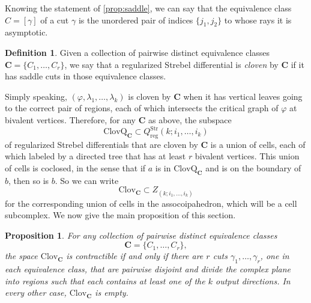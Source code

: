 \documentclass[11pt,a4paper]{amsart}
\newtheorem{proposition}[theorem]{Proposition}
\theoremstyle{definition}
\newtheorem{definition}{Definition}
\begin{document}
\noindent Knowing the statement of \cref{prop:saddle}, we can say that the equivalence class $C = [\gamma]$ of a cut $\gamma$ is the unordered pair of indices $\{j_1,j_2\}$ to whose rays it is asymptotic.
\begin{definition}
    Given a collection of pairwise distinct equivalence classes $\mathbf{C} = \{C_1,\dots,C_r\}$, we say that a regularized Strebel differential is \emph{cloven} by $\mathbf{C}$ if it has saddle cuts in those equivalence classes.
\end{definition}
\noindent Simply speaking, $(\varphi,\lambda_1,\dots,\lambda_k)$ is cloven by $\mathbf{C}$ when it has vertical leaves going to the correct pair of regions, each of which intersects the critical graph of $\varphi$ at bivalent vertices. Therefore, for any $\mathbf{C}$ as above, the subspace
\[ \mathrm{ClovQ}_\mathbf{C} \subset Q^\mathrm{Str}_\mathrm{reg}(k;i_1,\dots,i_k) \]
of regularized Strebel differentials that are cloven by $\mathbf{C}$ is a union of cells, each of which labeled by a directed tree that has at least $r$ bivalent vertices. This union of cells is coclosed, in the sense that if $a$ is in $\mathrm{ClovQ}_\mathbf{C}$ and is on the boundary of $b$, then so is $b$. So we can write
\[ \mathrm{Clov}_\mathbf{C} \subset Z_{(k;i_1,\dots,i_k)} \]
for the corresponding union of cells in the assocoipahedron, which will be a cell subcomplex. We now give the main proposition of this section.
\begin{proposition}\label{prop:contractible}
    For any collection of pairwise distinct equivalence classes 
    \[ \mathbf{C} = \{C_1,\dots,C_r\}, \] 
    the space $\mathrm{Clov}_\mathbf{C}$ is contractible if and only if there are $r$ cuts $\gamma_1,\dots,\gamma_r$, one in each equivalence class, that are pairwise disjoint and divide the complex plane into regions such that each contains at least one of the $k$ output directions. In every other case, $\mathrm{Clov}_\mathbf{C}$ is empty.
\end{proposition}
\end{document}
